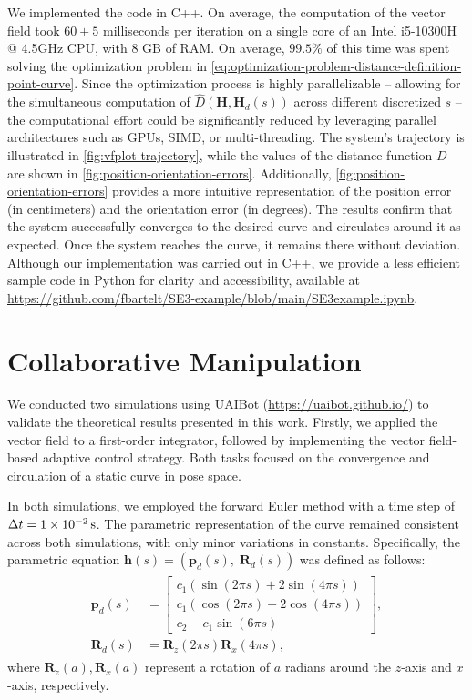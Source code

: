 We implemented the code in C++. On average, the computation of the vector field took $60\pm5$ milliseconds per iteration on a single core of an Intel i5-10300H @ 4.5GHz CPU, with 8 GB of RAM. On average, $99.5\%$ of this time was spent solving the optimization problem in \eqref{eq:optimization-problem-distance-definition-point-curve}. Since the optimization process is highly parallelizable -- allowing for the simultaneous computation of $\widehat{D}(\mathbf{H},\mathbf{H}_d(s))$ across different discretized $s$ -- the computational effort could be significantly reduced by leveraging parallel architectures such as GPUs, SIMD, or multi-threading. The system's trajectory is illustrated in \cref{fig:vfplot-trajectory}, while the values of the distance function $D$ are shown in \cref{fig:position-orientation-errors}. Additionally, \cref{fig:position-orientation-errors} provides a more intuitive representation of the position error (in centimeters) and the orientation error (in degrees). The results confirm that the system successfully converges to the desired curve and circulates around it as expected. Once the system reaches the curve, it remains there without deviation. Although our implementation was carried out in C++, we provide a less efficient sample code in Python for clarity and accessibility, available at \url{https://github.com/fbartelt/SE3-example/blob/main/SE3example.ipynb}.

\section{Collaborative Manipulation}
We conducted two simulations using UAIBot (\url{https://uaibot.github.io/}) to validate the theoretical results presented in this work. Firstly, we applied the vector field to a first-order integrator, followed by implementing the vector field-based adaptive control strategy. Both tasks focused on the convergence and circulation of a static curve in pose space.

In both simulations, we employed the forward Euler method with a time step of $\Delta t = \qty{1E-2}{\second}$. The parametric representation of the curve remained consistent across both simulations, with only minor variations in constants. Specifically, the parametric equation $\mathbf{h}(s)=(\mathbf{p}_d(s),\;\mathbf{R}_d(s))$ was defined as follows:
\begin{align}
\begin{split}
    \mathbf{p}_d(s) &= \begin{bmatrix}
        c_1(\sin(2\pi s) + 2\sin(4\pi s))\\
        c_1(\cos(2\pi s) - 2\cos(4\pi s))\\
        c_2 - c_1\sin(6\pi s)
    \end{bmatrix},\\
    \mathbf{R}_d(s) &= \mathbf{R}_z(2\pi s)\mathbf{R}_x(4\pi s),
    \end{split} \label{eq:parametriceq-simulation}
\end{align}
where $\mathbf{R}_z(a), \mathbf{R}_x(a)$ represent a rotation of $a$ radians around the $z$-axis and $x$-axis, respectively.

